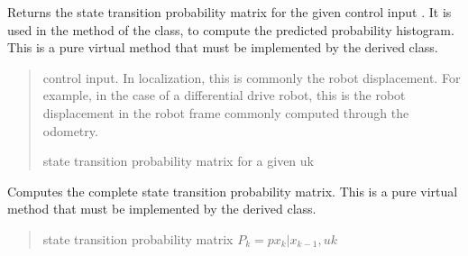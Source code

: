\documentclass[letterpaper,10pt,english]{sphinxmanual}
\begin{document}
\begin{fulllineitems}
\begin{fulllineitems}
\label{\detokenize{GridLocalization:GL.GL.StateTransitionProbability_4_uk}}
\pysigstartsignatures
{}
\pysigstopsignatures
\sphinxAtStartPar
Returns the state transition probability matrix for the given control input . It is used in the  method
of the  class, to compute the predicted probability histogram.
This is a pure virtual method that must be implemented by the derived class.
\begin{quote}\begin{description}
\sphinxAtStartPar
{} \textendash{} control input. In localization, this is commonly the robot displacement. For example, in the case of a differential drive robot, this is the robot displacement in the robot frame commonly computed through the odometry.

\sphinxAtStartPar
{} state transition probability matrix for a given uk

\end{description}\end{quote}

\end{fulllineitems}


\begin{fulllineitems}
\label{\detokenize{GridLocalization:GL.GL.StateTransitionProbability}}
\pysigstartsignatures
{}
\pysigstopsignatures
\sphinxAtStartPar
Computes the complete state transition probability matrix.
This is a pure virtual method that must be implemented by the derived class.
\begin{quote}\begin{description}
\sphinxAtStartPar
state transition probability matrix \(P_k=p{x_k|x_{k-1},uk}\)

\end{description}\end{quote}

\end{fulllineitems}


\end{fulllineitems}
\end{document}
